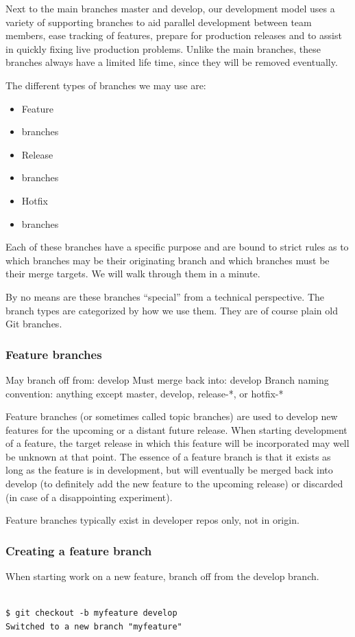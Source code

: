 Next to the main branches master and develop, our development model uses a
variety of supporting branches to aid parallel development between team members,
ease tracking of features, prepare for production releases and to assist in
quickly fixing live production problems. Unlike the main branches, these branches
always have a limited life time, since they will be removed eventually.

The different types of branches we may use are:
\begin{itemize}[itemsep=1pt, parsep=1pt]
  \item Feature
  \item branches
  \item Release
  \item branches
  \item Hotfix
  \item branches
\end{itemize}

Each of these branches have a specific purpose and are bound to strict rules as
to which branches may be their originating branch and which branches must be
their merge targets. We will walk through them in a minute.

By no means are these branches “special” from a technical perspective. The branch
types are categorized by how we use them. They are of course plain old Git
branches.

\subsubsection{Feature branches}

May branch off from: develop Must merge back into: develop Branch naming
convention: anything except master, develop, release-*, or hotfix-*

Feature branches (or sometimes called topic branches) are used to develop new
features for the upcoming or a distant future release. When starting development
of a feature, the target release in which this feature will be incorporated may
well be unknown at that point. The essence of a feature branch is that it exists
as long as the feature is in development, but will eventually be merged back into
develop (to definitely add the new feature to the upcoming release) or discarded
(in case of a disappointing experiment).

Feature branches typically exist in developer repos only, not in origin.

\subsubsection{Creating a feature branch}
When starting work on a new feature, branch off from the develop branch.\\\\
\begin{verbatim}
$ git checkout -b myfeature develop
Switched to a new branch "myfeature"
\end{verbatim}

